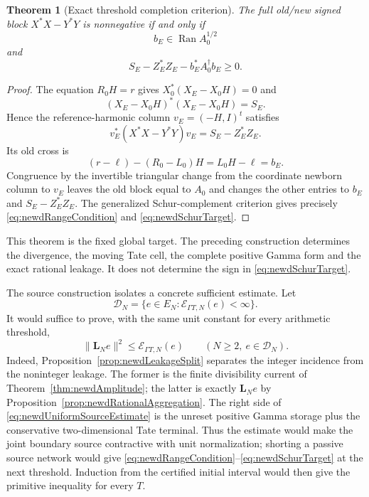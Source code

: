 \documentclass[11pt]{amsart}
\newtheorem{theorem}{Theorem}[section]
\theoremstyle{definition}
\theoremstyle{remark}
\begin{document}
\begin{theorem}[Exact threshold completion criterion]
\label{thm:newdThresholdCriterion}
The full old/new signed block $X^*X-Y^*Y$ is nonnegative if and only if
\begin{equation}\label{eq:newdRangeCondition}
 b_E\in\operatorname{Ran}A_0^{1/2}
\end{equation}
and
\begin{equation}\label{eq:newdSchurTarget}
 S_E-Z_E^*Z_E-b_E^*A_0^\dagger b_E\geq0.
\end{equation}
\end{theorem}

\begin{proof}
The equation $R_0H=r$ gives
$X_0^*(X_E-X_0H)=0$ and
\[
 (X_E-X_0H)^*(X_E-X_0H)=S_E.
\]
Hence the reference-harmonic column $v_E=(-H,I)^t$ satisfies
\[
 v_E^*(X^*X-Y^*Y)v_E=S_E-Z_E^*Z_E.
\]
Its old cross is
\[
 (r-\ell)-(R_0-L_0)H=L_0H-\ell=b_E.
\]
Congruence by the invertible triangular change from the coordinate newborn
column to $v_E$ leaves the old block equal to $A_0$ and changes the other
entries to $b_E$ and $S_E-Z_E^*Z_E$.  The generalized Schur-complement
criterion gives precisely \eqref{eq:newdRangeCondition} and
\eqref{eq:newdSchurTarget}.
\end{proof}

This theorem is the fixed global target.  The preceding construction
determines the divergence, the moving Tate cell, the complete positive Gamma
form and the exact rational leakage.  It does not determine the sign in
\eqref{eq:newdSchurTarget}.

The source construction isolates a concrete sufficient estimate.  Let
\[
 \mathscr D_N=
 \{e\in E_N:\mathcal E_{\Gamma T,N}(e)<\infty\}.
\]
It would suffice to prove, with the same unit constant for every arithmetic
threshold,
\begin{equation}\label{eq:newdUniformSourceEstimate}
 \|\mathbf L_Ne\|^2\leq\mathcal E_{\Gamma T,N}(e)
 \qquad(N\geq2,\ e\in\mathscr D_N).
\end{equation}
Indeed, Proposition~\ref{prop:newdLeakageSplit} separates the integer
incidence from the noninteger leakage.  The former is the finite
divisibility current of Theorem~\ref{thm:newdAmplitude}; the latter is
exactly $\mathbf L_Ne$ by
Proposition~\ref{prop:newdRationalAggregation}.  The right side of
\eqref{eq:newdUniformSourceEstimate} is the unreset positive Gamma storage
plus the conservative two-dimensional Tate terminal.  Thus the estimate
would make the joint boundary source contractive with unit normalization;
shorting a passive source network would give
\eqref{eq:newdRangeCondition}--\eqref{eq:newdSchurTarget} at the next
threshold.  Induction from the certified initial interval would then give
the primitive inequality for every $T$.
\end{document}

